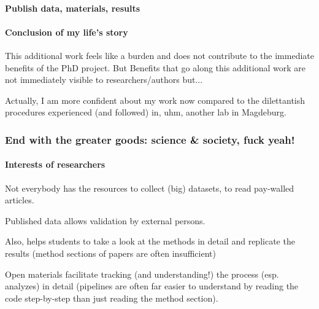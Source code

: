 \paragraph{Publish data, materials, results}





\paragraph{Conclusion of my life's story}

%
This additional work feels like a burden and does not contribute to the
immediate benefits of the PhD project.
%
But Benefits that go along this additional work are not immediately
visible to researchers/authors but...

%
Actually, I am more confident about my work now compared to the dilettantish
procedures experienced (and followed) in, uhm, another lab in Magdeburg.


\subsubsection{End with the greater goods: science \& society, fuck yeah!}


\paragraph{Interests of researchers}
%
Not everybody has the resources to collect (big) datasets, to read pay-walled
articles.

%
Published data allows validation by external persons.

%
Also, helps students to take a look at the methods in detail and replicate the
results (method sections of papers are often insufficient)

%
Open materials facilitate tracking (and understanding!) the process (esp.
analyzes) in detail (pipelines are often far easier to understand by reading the
code step-by-step than just reading the method section).



